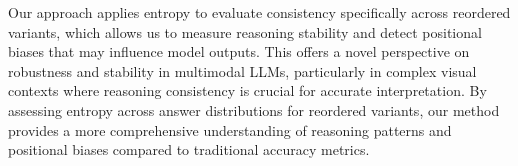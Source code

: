 Our approach applies entropy to evaluate consistency specifically across reordered variants, which allows us to measure reasoning stability and detect positional biases that may influence model outputs. This offers a novel perspective on robustness and stability in multimodal LLMs, particularly in complex visual contexts where reasoning consistency is crucial for accurate interpretation. By assessing entropy across answer distributions for reordered variants, our method provides a more comprehensive understanding of reasoning patterns and positional biases compared to traditional accuracy metrics.


